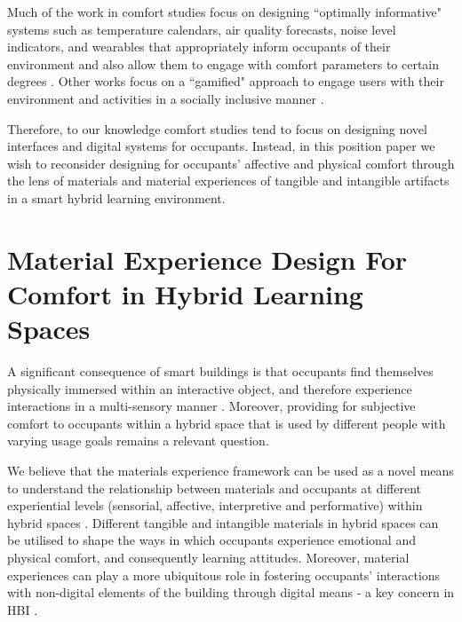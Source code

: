 \documentclass[acmconf, anonymous, review]{acmart}
\begin{document}
Much of the work in comfort studies focus on designing ``optimally informative" systems such as temperature calendars, air quality forecasts, noise level indicators, and wearables that appropriately inform occupants of their environment and also allow them to engage with comfort parameters to certain degrees  \cite{costanza2016bit, milenkovic2013improving, kim2020designing}. Other works focus on a ``gamified" approach to engage users with their environment and activities in a socially inclusive manner \cite{mathur2015tiny, kwallek1997impact, zhong2022augmenting}. 

Therefore, to our knowledge comfort studies tend to focus on designing novel interfaces and digital systems for occupants. Instead, in this position paper we wish to reconsider designing for occupants' affective and physical comfort through the lens of materials and material experiences of tangible and intangible artifacts in a smart hybrid learning environment. 


\section{Material Experience Design For Comfort in Hybrid Learning Spaces}

A significant consequence of smart buildings is that occupants find themselves physically immersed within an interactive object, and therefore experience interactions in a multi-sensory manner \cite{nembrini2017human}. Moreover, providing for subjective comfort to occupants within a hybrid space that is used by different people with varying usage goals remains a relevant question. 

We believe that the materials experience framework can be used as a novel means to understand the relationship between materials and occupants at different experiential levels (sensorial, affective, interpretive and performative) within hybrid spaces \cite{giaccardi2015foundations}. Different tangible and intangible materials in hybrid spaces can be utilised to shape the ways in which occupants experience emotional and physical comfort, and consequently learning attitudes. Moreover, material
experiences can play a more ubiquitous role in fostering occupants' interactions with non-digital elements of the building through digital means - a key concern in HBI \cite{nembrini2017human}. 

\end{document}
